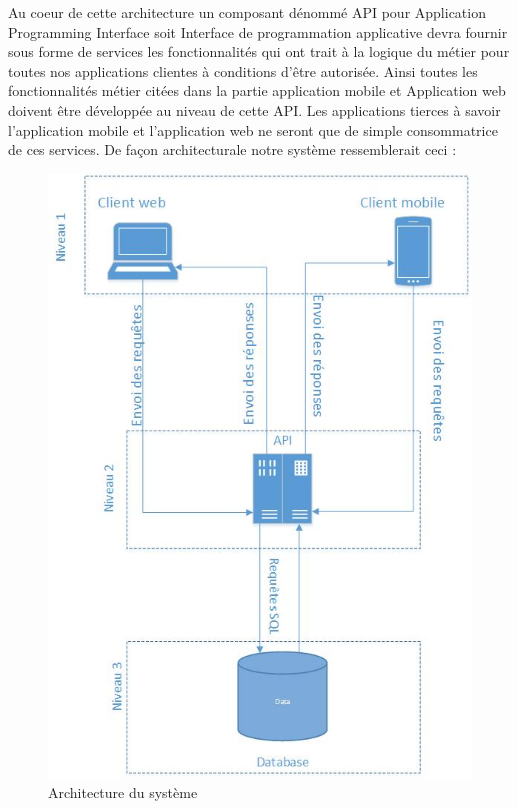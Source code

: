 Au coeur de cette architecture un composant dénommé API pour Application Programming Interface soit
Interface de programmation applicative devra fournir sous forme de services les
fonctionnalités qui ont trait à la logique du métier pour toutes nos applications clientes à conditions d'être autorisée. Ainsi toutes les fonctionnalités métier citées dans la partie application mobile et Application web doivent être développée au niveau de cette API. Les applications tierces à savoir l’application mobile et l’application web ne seront que de simple consommatrice de ces services.
De façon architecturale notre système ressemblerait ceci :
$ $
\begin{figure}[H]
	\begin{center}
		\includegraphics[width=14cm]{images/techno/3tiers.jpg}
	\end{center}
	\caption{Architecture du système}
\end{figure}
$ $
